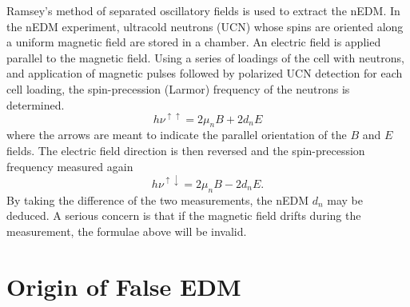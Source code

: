 Ramsey's method of separated oscillatory fields \cite{bib:ramsey} is
used to extract the nEDM.  In the nEDM experiment, ultracold neutrons
(UCN) whose spins are oriented along a uniform magnetic field are
stored in a chamber.  An electric field is applied parallel to the
magnetic field.
Using a series of loadings of the cell with neutrons, and application
of magnetic pulses followed by polarized UCN detection for each cell
loading, the spin-precession (Larmor) frequency of the neutrons is
determined.
\begin{equation}\label{my_first_eqn}  
    h\nu^{\uparrow\uparrow}=2\mu_nB+2d_nE
\end{equation}
where the arrows are meant to indicate the parallel orientation of the $B$ and $E$ fields.  The electric field direction is then reversed and the spin-precession frequency measured again
\begin{equation}\label{my_first_eqn}  
    h\nu^{\uparrow\downarrow}=2\mu_nB-2d_nE.
\end{equation}
By taking the difference of the two measurements, the nEDM $d_n$ may
be deduced.
A serious concern is that if the magnetic field drifts during the
measurement, the formulae above will be invalid.
%

\section{Origin of False EDM}

